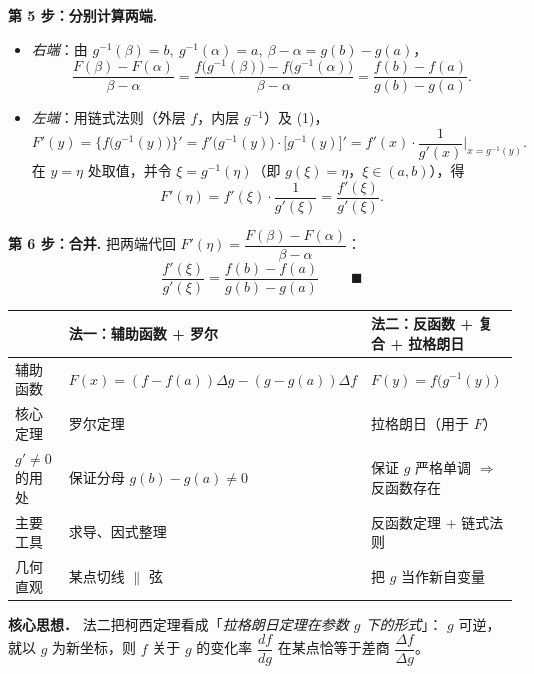 \documentclass[11pt]{article}
\begin{document}
\vspace{2mm}
\noindent\textbf{第 5 步：分别计算两端.}
\begin{itemize}
\item \emph{右端}：由 $g^{-1}(\beta)=b,\ g^{-1}(\alpha)=a,\ \beta-\alpha=g(b)-g(a)$，
\[
\frac{F(\beta)-F(\alpha)}{\beta-\alpha}
=\frac{f\big(g^{-1}(\beta)\big)-f\big(g^{-1}(\alpha)\big)}{\beta-\alpha}
=\frac{f(b)-f(a)}{g(b)-g(a)}.
\]
\item \emph{左端}：用链式法则（外层 $f$，内层 $g^{-1}$）及 (1)，
\[
F'(y)=\big\{f\big(g^{-1}(y)\big)\big\}'
=f'\big(g^{-1}(y)\big)\cdot\big[g^{-1}(y)\big]'
=f'(x)\cdot\frac{1}{g'(x)}\Big|_{x=g^{-1}(y)}.
\]
在 $y=\eta$ 处取值，并令 $\xi=g^{-1}(\eta)$（即 $g(\xi)=\eta$，$\xi\in(a,b)$），得
\[
F'(\eta)=f'(\xi)\cdot\frac{1}{g'(\xi)}=\frac{f'(\xi)}{g'(\xi)}.
\]
\end{itemize}

\vspace{2mm}
\noindent\textbf{第 6 步：合并.} 把两端代回 $F'(\eta)=\dfrac{F(\beta)-F(\alpha)}{\beta-\alpha}$：
\[
\boxed{\;\frac{f'(\xi)}{g'(\xi)}=\frac{f(b)-f(a)}{g(b)-g(a)}\;}\qquad\blacksquare
\]

\begin{tcolorbox}[colback=boxbg,colframe=auxc!70,title={\bfseries 两种证明对照}]
\renewcommand{\arraystretch}{1.4}
\begin{tabular}{>{\raggedright\arraybackslash}p{2.8cm} >{\raggedright\arraybackslash}p{5.6cm} >{\raggedright\arraybackslash}p{5.6cm}}
\toprule
& \textbf{法一：辅助函数 + 罗尔} & \textbf{法二：反函数 + 复合 + 拉格朗日}\\
\midrule
辅助函数 & $F(x)=(f{-}f(a))\Delta g-(g{-}g(a))\Delta f$ & $F(y)=f\big(g^{-1}(y)\big)$\\
核心定理 & 罗尔定理 & 拉格朗日（用于 $F$）\\
$g'\neq0$ 的用处 & 保证分母 $g(b)-g(a)\neq0$ & 保证 $g$ 严格单调 $\Rightarrow$ 反函数存在\\
主要工具 & 求导、因式整理 & 反函数定理 + 链式法则\\
几何直观 & 某点切线 $\parallel$ 弦 & 把 $g$ 当作新自变量\\
\bottomrule
\end{tabular}
\end{tcolorbox}

\noindent\textbf{核心思想．} 法二把柯西定理看成「\emph{拉格朗日定理在参数 $g$ 下的形式}」：
$g$ 可逆，就以 $g$ 为新坐标，则 $f$ 关于 $g$ 的变化率 $\dfrac{df}{dg}$ 在某点恰等于差商 $\dfrac{\Delta f}{\Delta g}$。
\end{document}
